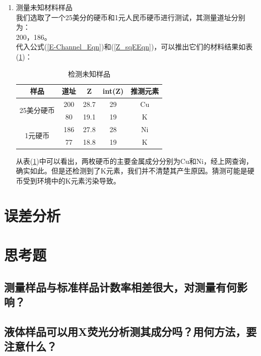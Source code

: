 \documentclass[a4paper]{article}
\begin{document}
\begin{enumerate}
\item 测量未知材料样品\\
我们选取了一个25美分的硬币和1元人民币硬币进行测试，其测量道址分别为：\\
200，186。\\
代入公式(\ref{E-Channel_Eqn})和(\ref{Z_sqEEqn})，可以推出它们的材料结果如表(\ref{unknown})：\\
\begin{table}[!h]
\centering
\caption{检测未知样品}
\label{unknown}
\begin{tabular}{|c|c|c|c|c|}
\hline
样品                      & 道址  & Z    & int(Z) & 推测元素 \\ \hline
\multirow{2}{*}{25美分硬币} & 200 & 28.7 & 29     & Cu \\ \cline{2-5} 
                        & 80  & 19.1 & 19     & K  \\ \hline
\multirow{2}{*}{1元硬币}   & 186 & 27.8 & 28     & Ni \\ \cline{2-5} 
                        & 77  & 18.8 & 19     & K  \\ \hline
\end{tabular}
\end{table}

从表(\ref{unknown})中可以看出，两枚硬币的主要金属成分分别为Cu和Ni，经上网查询，确实如此。但是还检测到了K元素，我们并不清楚其产生原因。猜测可能是硬币受到环境中的K元素污染导致。
\end{enumerate}

\section{误差分析}

\section{思考题}
\subsection{测量样品与标准样品计数率相差很大，对测量有何影响？}
\subsection{液体样品可以用X荧光分析测其成分吗？用何方法，要注意什么？}

\nocite{jiaocai}

\end{document}
